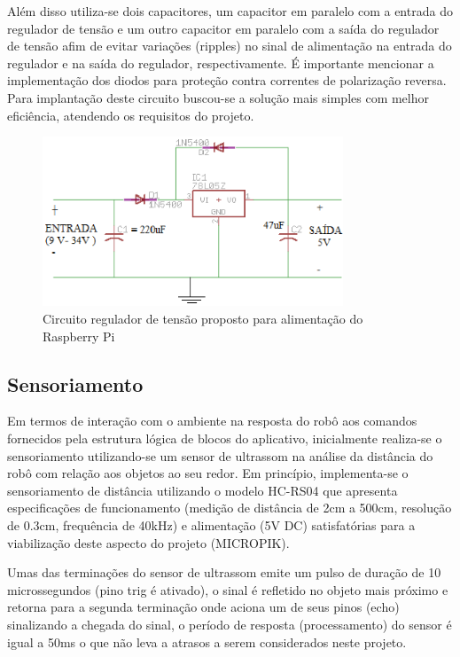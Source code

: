 Além disso utiliza-se dois capacitores, um capacitor em paralelo com a entrada do regulador de tensão e um outro capacitor em paralelo com a saída do regulador de tensão afim de evitar variações (ripples) no sinal de alimentação na entrada do regulador e na saída do regulador, respectivamente. É importante mencionar a implementação dos diodos para proteção contra correntes de polarização reversa. Para implantação deste circuito buscou-se a solução mais simples com melhor eficiência, atendendo os requisitos do projeto.

\begin{figure}[H]
    \centering
    \includegraphics[width=0.8\textwidth]{figuras/esquematico_regulador.eps}
    \caption{Circuito regulador de tensão proposto para alimentação do Raspberry Pi}
    \label{fig:catia01}
\end{figure}

\subsection{Sensoriamento}

Em termos de interação com o ambiente na resposta do robô aos comandos fornecidos pela estrutura lógica de blocos do aplicativo, inicialmente realiza-se o sensoriamento utilizando-se um sensor de ultrassom na análise da distância do robô com relação aos objetos ao seu redor. Em princípio, implementa-se o sensoriamento de distância utilizando o modelo HC-RS04 que apresenta especificações de funcionamento (medição de distância de 2cm a 500cm, resolução de 0.3cm, frequência de 40kHz) e alimentação (5V DC) satisfatórias para a viabilização deste aspecto do projeto (MICROPIK).

Umas das terminações do sensor de ultrassom emite um pulso de duração de 10 microssegundos (pino trig é ativado), o sinal é refletido no objeto mais próximo e retorna para a segunda terminação onde aciona um de seus pinos (echo) sinalizando a chegada do sinal, o período de resposta (processamento) do sensor é igual a 50ms o que não leva a atrasos a serem considerados neste projeto. 


